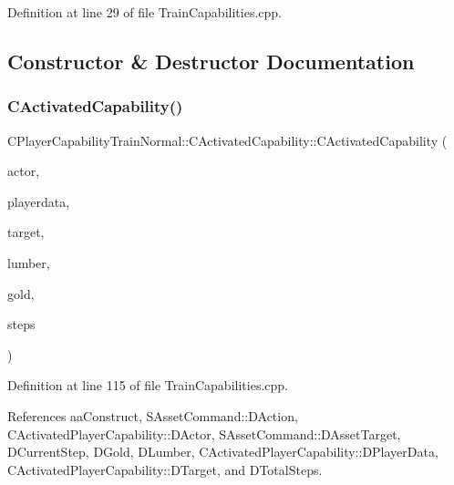 Definition at line 29 of file Train\+Capabilities.\+cpp.



\subsection{Constructor \& Destructor Documentation}
\hypertarget{classCPlayerCapabilityTrainNormal_1_1CActivatedCapability_a6d160dbc57c968390a91f0797cc53306}{}\label{classCPlayerCapabilityTrainNormal_1_1CActivatedCapability_a6d160dbc57c968390a91f0797cc53306} 
\subsubsection{\texorpdfstring{C\+Activated\+Capability()}{CActivatedCapability()}}
{\footnotesize\ttfamily C\+Player\+Capability\+Train\+Normal\+::\+C\+Activated\+Capability\+::\+C\+Activated\+Capability (\begin{DoxyParamCaption}\item[{std\+::shared\+\_\+ptr$<$ \hyperlink{classCPlayerAsset}{C\+Player\+Asset} $>$}]{actor,  }\item[{std\+::shared\+\_\+ptr$<$ \hyperlink{classCPlayerData}{C\+Player\+Data} $>$}]{playerdata,  }\item[{std\+::shared\+\_\+ptr$<$ \hyperlink{classCPlayerAsset}{C\+Player\+Asset} $>$}]{target,  }\item[{int}]{lumber,  }\item[{int}]{gold,  }\item[{int}]{steps }\end{DoxyParamCaption})}



Definition at line 115 of file Train\+Capabilities.\+cpp.



References aa\+Construct, S\+Asset\+Command\+::\+D\+Action, C\+Activated\+Player\+Capability\+::\+D\+Actor, S\+Asset\+Command\+::\+D\+Asset\+Target, D\+Current\+Step, D\+Gold, D\+Lumber, C\+Activated\+Player\+Capability\+::\+D\+Player\+Data, C\+Activated\+Player\+Capability\+::\+D\+Target, and D\+Total\+Steps.


